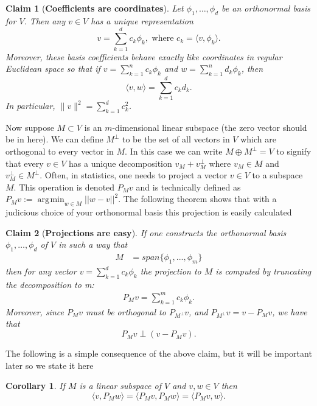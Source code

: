 \documentclass[11pt]{report}
\newtheorem{claim}{Claim}
\newtheorem{corollary}{Corollary}
\DeclareMathOperator*{\argmin}{\arg\!\min}
\begin{document}
\begin{claim}[{\bf Coefficients are coordinates}] Let $\phi_1,\ldots, \phi_d$ be an orthonormal basis for $V$. Then any $v\in V$ has a unique representation 
\[\boxed{ v = \sum_{k=1}^d c_k \phi_k,\,\,\text{where $c_k = \langle v, \phi_k\rangle$}.} \]
 Moreover, these basis coefficients behave exactly like coordinates in regular Euclidean space so that if $v = \sum_{k=1}^n c_k \phi_k$ and $w = \sum_{k=1}^n d_k \phi_k$, then
\[
\boxed{\langle v,w\rangle = \sum_{k=1}^d c_kd_k.}
\]
In particular,  $\| v \|^2 = \sum_{k=1}^d c_k^2$.
\end{claim}



Now suppose  $M\subset V$ is an $m$-dimensional linear subspace (the zero vector should be in here). We can define $M^{\perp}$ to be the set of all vectors in $V$ which are orthogonal to  every vector in $M$. In this case we can write $M \oplus M^{\perp} = V$ to signify that every $v\in V$ has a unique decomposition $v_M + v_M^\perp$ where $v_M\in M$ and $v_M^\perp \in M^\perp$. Often, in statistics, one needs to project a vector $v\in V$ to a subspace $M$. This operation is denoted $P_M v$ and is technically defined as $P_Mv := \argmin_{w \in M} ||w-v||^2 $. The following theorem shows that with a judicious choice of your orthonormal basis this projection is easily calculated

\begin{claim}[{\bf Projections are easy}] If one constructs the orthonormal basis $\phi_1,\ldots, \phi_d$ of $V$ in such a way that
\begin{align*}
	M &= span\{\phi_1,...,\phi_m\} \label{span} 
\end{align*}
then for any vector $v=\sum_{k=1}^d c_k \phi_k$ the projection to $M$ is computed by truncating the decomposition to m:
\begin{align}
\boxed{P_Mv = \sum\limits_{k=1}^m c_k\phi_k }.
\end{align}
Moreover, since $P_Mv$ must be orthogonal to  $P_{M^{\perp}}v$, and $P_{M^{\perp}}v = v - P_Mv$, we have that 
\[\boxed{P_Mv \perp (v - P_Mv).}\]

\end{claim}



The following is a simple consequence of the above claim, but it will be important later so we state it here
\begin{corollary}
If $M$ is a linear subspace of $V$ and $v,w \in V$ then
\[\langle v, P_M w\rangle = \langle P_M v, P_M w\rangle = \langle P_M v,  w\rangle. \]  
\end{corollary}
\end{document}
